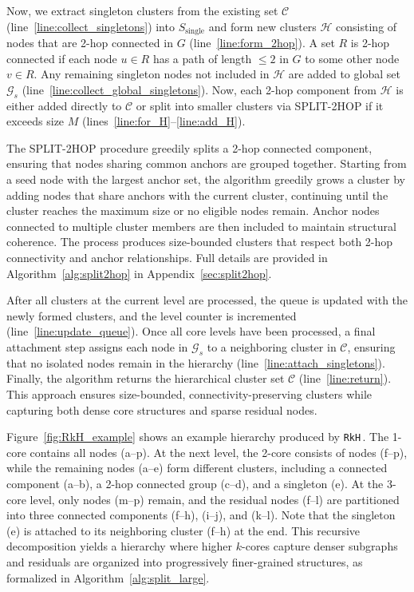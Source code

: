 \documentclass[sigconf]{acmart}
\newcommand{\KHC}{\texttt{RkH}\,}
\begin{document}
Now, we extract singleton clusters from the existing set $\mathcal{C}$ (line~\ref{line:collect_singletons}) into $S_{\text{single}}$ and form new clusters $\mathcal{H}$ consisting of nodes that are 2-hop connected in $G$ (line~\ref{line:form_2hop}). 
A set $R$ is 2-hop connected if each node $u \in R$ has a path of length $\le 2$ in $G$ to some other node $v \in R$.
Any remaining singleton nodes not included in $\mathcal{H}$ are added to global set $\mathcal{G}_s$ (line~\ref{line:collect_global_singletons}).
Now, each 2-hop component from $\mathcal{H}$ is either added directly to $\mathcal{C}$ or split into smaller clusters via  \textsc{SPLIT-2HOP} if it exceeds size $M$ (lines~\ref{line:for_H}–\ref{line:add_H}). 

The \textsc{SPLIT-2HOP} procedure greedily splits a 2-hop connected component, ensuring that nodes sharing common anchors are grouped together.
Starting from a seed node with the largest anchor set, the algorithm greedily grows a cluster by adding nodes that share anchors with the current cluster, continuing until the cluster reaches the maximum size or no eligible nodes remain. 
Anchor nodes connected to multiple cluster members are then included to maintain structural coherence. 
The process produces size-bounded clusters that respect both 2-hop connectivity and anchor relationships. Full details are provided in Algorithm~\ref{alg:split2hop} in Appendix~\ref{sec:split2hop}.

After all clusters at the current level are processed, the queue is updated with the newly formed clusters, and the level counter is incremented (line~\ref{line:update_queue}). 
Once all core levels have been processed, a final attachment step assigns each node in $\mathcal{G}_s$ to a neighboring cluster in $\mathcal{C}$, ensuring that no isolated nodes remain in the hierarchy (line~\ref{line:attach_singletons}).
Finally, the algorithm returns the hierarchical cluster set $\mathcal{C}$ (line~\ref{line:return}). This approach ensures size-bounded, connectivity-preserving clusters while capturing both dense core structures and sparse residual nodes.


Figure~\ref{fig:RkH_example} shows an example hierarchy produced by \KHC.
The 1-core contains all nodes (a–p). 
At the next level, the 2-core consists of nodes (f–p), while the remaining nodes (a–e) form different clusters, including a connected component (a–b), a 2-hop connected group (c–d), and a singleton (e). 
At the 3-core level, only nodes (m–p) remain, and the residual nodes (f–l) are partitioned into three connected components (f–h), (i–j), and (k–l).
Note that the singleton (e) is attached to its neighboring cluster (f–h) at the end.
This recursive decomposition yields a hierarchy where higher $k$-cores capture denser subgraphs and residuals are organized into progressively finer-grained structures, as formalized in Algorithm~\ref{alg:split_large}.
\end{document}
